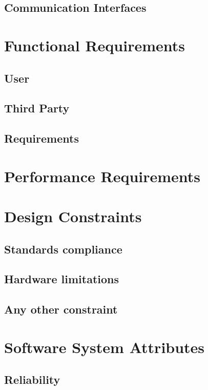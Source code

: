 \documentclass[12pt]{report}
\begin{document}
        \subsection{Communication Interfaces}
    \section{Functional Requirements}
        \subsection{User}
            
        \newpage
        \subsection{Third Party}
            
        \subsection{Requirements}
        	
    \section{Performance Requirements}
    	
    \section{Design Constraints}
        \subsection{Standards compliance}
        	
        \subsection{Hardware limitations}
        	
        \subsection{Any other constraint}
        	
    \section{Software System Attributes}
        \subsection{Reliability}
        	
\end{document}
